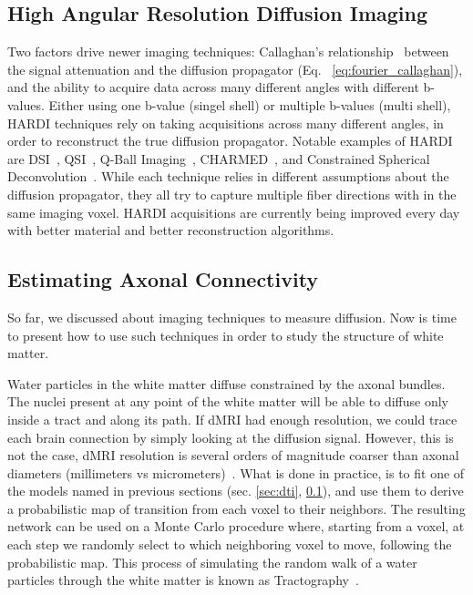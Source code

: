\subsection{High Angular Resolution Diffusion Imaging}
\label{sec:hardi}
Two factors drive newer imaging techniques: Callaghan's relationship~\cite{Callaghan1991}
between the signal attenuation and the diffusion propagator 
(Eq. ~\ref{eq:fourier_callaghan}), and the ability to acquire data across many
different angles with different b-values. Either using one b-value (singel shell)
or multiple b-values (multi shell), HARDI techniques rely on taking acquisitions
across many different angles, in order to reconstruct the true diffusion propagator.
Notable examples of HARDI are DSI~\cite{Wedeen2008},  QSI~\cite{Callaghan1991},
Q-Ball Imaging~\cite{Tuch2004}, CHARMED~\cite{Assaf2005}, and
Constrained Spherical Deconvolution~\cite{Tournier2004}. While each technique
relies in different assumptions about the diffusion propagator,
they all try to capture multiple fiber directions with in the same imaging
voxel. HARDI acquisitions are currently being improved every day with better 
material and better reconstruction algorithms.

\subsection{Estimating Axonal Connectivity}
So far, we discussed about imaging techniques to measure diffusion. Now is time
to present how to use such techniques in order to study the structure of white matter.

Water particles in the white matter diffuse constrained by the axonal bundles.
The nuclei present at any point of the white matter will be able to diffuse
only inside a tract and along its path. If dMRI had enough resolution, we
could trace each brain connection by simply looking at the diffusion signal.
However, this is not the case, dMRI resolution is several orders of magnitude
coarser than axonal diameters (millimeters vs micrometers)~\cite{VanEssen2014}.
What is done in practice, is to fit one of the models named in previous sections
(sec. \ref{sec:dti}, \ref{sec:hardi}), and use them to derive a probabilistic
map of transition from each voxel to their neighbors. The resulting network can
be used on a Monte Carlo procedure where, starting from a voxel, at each step we
randomly select to which neighboring voxel to move, following the
probabilistic map. This process of simulating the random walk of a water
particles through the white matter is known as Tractography~\cite{Behrens2003a}.

